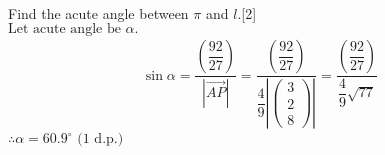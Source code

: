\documentclass[12pt, a4 paper]{article}
\begin{document}
\begin{outline}[enumerate]
\begin{align*}
					\end{align*}
					\color{black}
					\2 Find the acute angle between $\pi $ and $l$.\hfill[2]
					\color{blue}\\
					${\textrm{Let acute angle be }}\alpha {\textrm{.}}$
					\begin{align*}
						\sin \alpha  = \dfrac{{\left( {\dfrac{{92}}{{27}}} \right)}}{{\left| {\overrightarrow {AP} } \right|}} = \dfrac{{\left( {\dfrac{{92}}{{27}}} \right)}}{{\dfrac{4}{9}\left| {\left( {\begin{array}{*{20}{c}}3 \\2\\8\end{array}} \right)} \right|}} = \dfrac{{\left( {\dfrac{{92}}{{27}}} \right)}}{{\dfrac{4}{9}\sqrt {77} }}
					\end{align*}
					$\therefore \alpha  = 60.9^\circ {\textrm{ (1 d}}{\textrm{.p}}{\textrm{.)}}$
					\color{black}
															

\end{outline}
\end{document}
